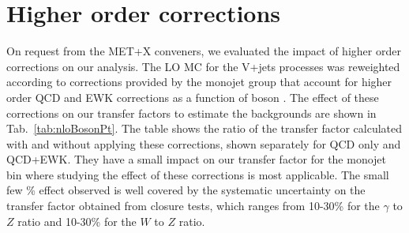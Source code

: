 



\section{Higher order corrections}

On request from the MET+X conveners, we evaluated the impact of higher order 
corrections on our analysis. The LO MC for the V+jets processes was reweighted 
according to corrections provided by the monojet group that account for higher 
order QCD and EWK corrections as a function of boson \Pt \cite{Monojet:AN2015-072}. The effect of these 
corrections on our transfer factors to estimate the backgrounds are 
shown in Tab.~\ref{tab:nloBosonPt}. The table shows the ratio of the transfer factor calculated 
with and without applying these corrections, shown separately for QCD only and 
QCD+EWK. They have a small impact on our transfer factor for the monojet bin 
where studying the effect of these corrections is most applicable. The small few \% effect observed is well covered by the systematic uncertainty on the 
transfer factor obtained from closure tests, which ranges from 10-30\% for the 
$\gamma$ to $Z$ ratio and 10-30\% for the $W$ to $Z$ ratio. 


